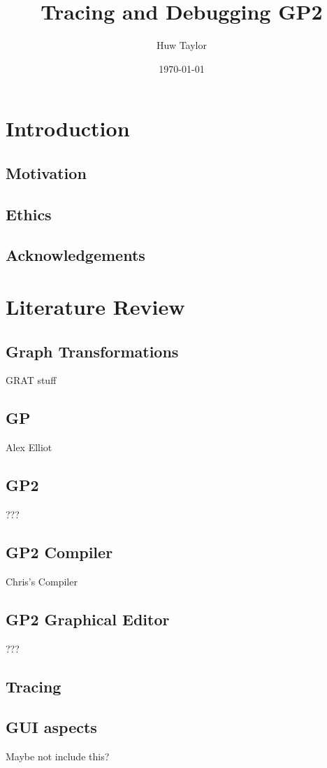 \documentclass{article}
\author{Huw Taylor}
\title{Tracing and Debugging GP2}
\date{\today}
\begin{document}
\maketitle
\listoffigures
\listoftables

\chapter{Introduction}
\section{Motivation}
\section{Ethics}
\section{Acknowledgements}

\chapter{Literature Review}
\section{Graph Transformations}
GRAT stuff
\section{GP}
Alex Elliot
\section{GP2}
???
\section{GP2 Compiler}
Chris's Compiler
\section{GP2 Graphical Editor}
???
\section{Tracing}

\section{GUI aspects}
Maybe not include this?
\end{document}

